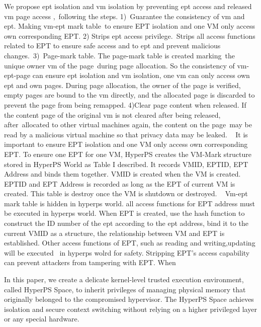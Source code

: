 We propose ept isolation and vm isolation by preventing ept access and released vm page access , following the steps. 1) Guarantee the consistency of vm and ept. Making vm-ept mark table to ensure EPT isolation and one VM only access own corresponding EPT. 2) Strips ept access privilege. Strips all access functions related to EPT to ensure safe access and to ept and prevent malicious changes. 3) Page-mark table. The page-mark table is created marking the unique owner vm of the page during page allocation. So the consistency of vm-ept-page can ensure ept isolation and vm isolation, one vm can only access own ept and own pages. During page allocation, the owner of the page is verified, empty pages are bound to the vm directly, and the allocated page is discarded to prevent the page from being remapped. 4)Clear page content when released. If the content page of the original vm is not cleared after being released, after allocated to other virtual machines again, the content on the page may be read by a malicious virtual machine so that privacy data may be leaked.
 
It is important to ensure EPT isolation and one VM only access own corresponding EPT. To ensure one EPT for one VM, HyperPS creates the VM-Mark structure stored in HyperPS World as Table I described. It records VMID, EPTID, EPT Address and binds them together. VMID is created when the VM is created. EPTID and EPT Address is recorded as long as the EPT of current VM is created. This table is destroy once the VM is shutdown or destroyed.
 
Vm-ept mark table is hidden in hyperps world. all access functions for EPT address must be executed in hyperps world. When EPT is created, use the hash function to construct the ID number of the ept according to the ept address, bind it to the current VMID as a structure, the relationship between VM and EPT is established. Other access functions of EPT, such as reading and writing,updating will be executed  in hyperps wolrd for safety.
Stripping EPT's access capability can prevent attackers from tampering with EPT. When 
\fi


In this paper, we create a delicate kernel-level trusted execution environment, called HyperPS Space, to inherit privileges of managing physical memory that originally belonged to the compromised hypervisor. 
The HyperPS Space achieves isolation and secure context switching without relying on a higher privileged layer or any special hardware. 

